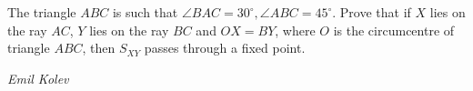 The triangle $ABC$ is such that $\angle BAC=30^{\circ},\angle ABC=45^{\circ}$. Prove that if $X$ lies on the ray $AC$, $Y$ lies on the ray $BC$ and $OX=BY$, where $O$ is the circumcentre of triangle $ABC$, then $S_{XY}$ passes through a fixed point.

\textit{Emil Kolev }